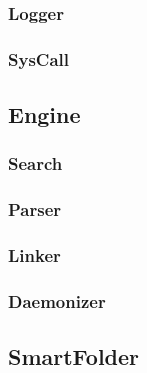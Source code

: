 \documentclass[a4paper]{article}
\begin{document}
\subsubsection{Logger}
\subsubsection{SysCall}
\subsection{Engine}
\subsubsection{Search}
\subsubsection{Parser}
\subsubsection{Linker}
\subsubsection{Daemonizer}
\subsection{SmartFolder}
\end{document}
